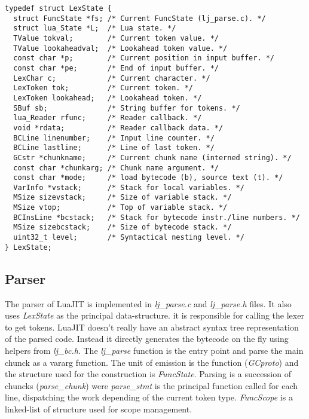 \begin{lstlisting}[style=CStyle]
typedef struct LexState {
  struct FuncState *fs; /* Current FuncState (lj_parse.c). */
  struct lua_State *L;  /* Lua state. */
  TValue tokval;        /* Current token value. */
  TValue lookaheadval;  /* Lookahead token value. */
  const char *p;        /* Current position in input buffer. */
  const char *pe;       /* End of input buffer. */
  LexChar c;            /* Current character. */
  LexToken tok;         /* Current token. */
  LexToken lookahead;   /* Lookahead token. */
  SBuf sb;              /* String buffer for tokens. */
  lua_Reader rfunc;     /* Reader callback. */
  void *rdata;          /* Reader callback data. */
  BCLine linenumber;    /* Input line counter. */
  BCLine lastline;      /* Line of last token. */
  GCstr *chunkname;     /* Current chunk name (interned string). */
  const char *chunkarg; /* Chunk name argument. */
  const char *mode;     /* load bytecode (b), source text (t). */
  VarInfo *vstack;      /* Stack for local variables. */
  MSize sizevstack;     /* Size of variable stack. */
  MSize vtop;           /* Top of variable stack. */
  BCInsLine *bcstack;   /* Stack for bytecode instr./line numbers. */
  MSize sizebcstack;    /* Size of bytecode stack. */
  uint32_t level;       /* Syntactical nesting level. */
} LexState;
\end{lstlisting}


\subsection{Parser}
\label{Subsec:Parser}

The parser of LuaJIT is implemented in \emph{lj\_parse.c} and \emph{lj\_parse.h}
files. It also uses \emph{LexState} as the principal data-structure. it is
responsible for calling the lexer to get tokens. LuaJIT doesn't really have an
abstract syntax tree representation of the parsed code. Instead it directly
generates the bytecode on the fly using helpers from \emph{lj\_bc.h}.
The \emph{lj\_parse} function is the entry point and parse the main chunck as a
vararg function. The unit of emission is the function (\emph{GCproto}) and the structure used for the construction is \emph{FuncState}. Parsing is a succession
of chuncks (\emph{parse\_chunk}) were \emph{parse\_stmt} is the principal
function called for each line, dispatching the work depending of the current
token type. \emph{FuncScope} is a linked-list of structure used for scope
management.

